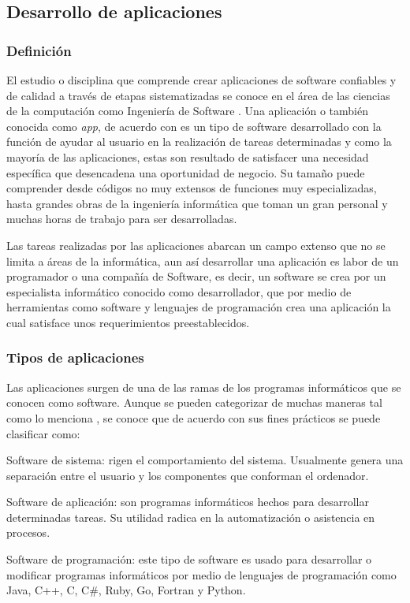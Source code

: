 \subsection{Desarrollo de aplicaciones}
\subsubsection{Definición}
El estudio o disciplina que comprende crear aplicaciones de software confiables y de calidad a través de etapas sistematizadas se conoce en el área de las ciencias de la computación como Ingeniería de Software \parencite{Sommerville2005}. Una aplicación o también conocida como \textit{app}, de acuerdo con \textcite{Pressman2002} es un tipo de software desarrollado con la función de ayudar al usuario en la realización de tareas determinadas y como la mayoría de las aplicaciones, estas son resultado de satisfacer una necesidad específica que desencadena una oportunidad de negocio. Su tamaño puede comprender desde códigos no muy extensos de funciones muy especializadas, hasta grandes obras de la ingeniería informática que toman un gran personal y muchas horas de trabajo para ser desarrolladas.

Las tareas realizadas por las aplicaciones abarcan un campo extenso que no se limita a áreas de la informática, aun así desarrollar una aplicación es labor de un programador o una compañía de Software, es decir, un software se crea por un especialista informático conocido como desarrollador, que por medio de herramientas como software y lenguajes de programación crea una aplicación la cual satisface unos requerimientos preestablecidos. 

\subsubsection{Tipos de aplicaciones}
Las aplicaciones surgen de una de las ramas de los programas informáticos que se conocen como software. Aunque se pueden categorizar de muchas maneras tal como lo menciona \parencite{Pressman2002}, se conoce que de acuerdo con sus fines prácticos se puede clasificar como:

\begin{APAitemize}
    \item Software de sistema: rigen el comportamiento del sistema. Usualmente genera una separación entre el usuario y los componentes que conforman el ordenador. 
    \item Software de aplicación: son programas informáticos hechos para desarrollar determinadas tareas. Su utilidad radica en la automatización o asistencia en procesos.
    \item Software de programación: este tipo de software es usado para desarrollar o modificar programas informáticos por medio de lenguajes de programación como Java, C++, C, C\#, Ruby, Go, Fortran y Python.
\end{APAitemize}

